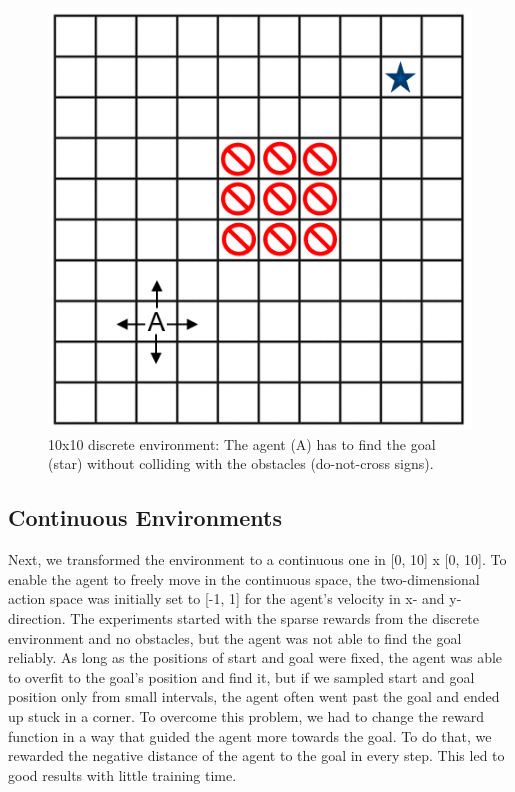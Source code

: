 \documentclass[conference]{IEEEtran}
\begin{document}
\begin{figure}[htbp]
\centerline{\includegraphics{discrete.png}}
\caption{10x10 discrete environment: The agent (A) has to find the goal (star) without colliding with the obstacles (do-not-cross signs).}
\label{fig1}
\end{figure}

\subsection{Continuous Environments}

Next, we transformed the environment to a continuous one in [0, 10] x [0, 10]. To enable the agent to freely move in the continuous space, the two-dimensional action space was initially set to [-1, 1] for the agent's velocity in x- and y-direction. The experiments started with the sparse rewards from the discrete environment and no obstacles, but the agent was not able to find the goal reliably. As long as the positions of start and goal were fixed, the agent was able to overfit to the goal's position and find it, but if we sampled start and goal position only from small intervals, the agent often went past the goal and ended up stuck in a corner. To overcome this problem, we had to change the reward function in a way that guided the agent more towards the goal. To do that, we rewarded the negative distance of the agent to the goal in every step. This led to good results with little training time.
\end{document}
